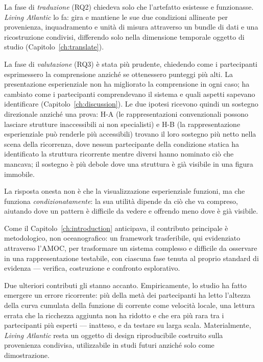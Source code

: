 La fase di \emph{traduzione} (RQ2) chiedeva solo che l'artefatto esistesse e funzionasse. \emph{Living Atlantic} lo fa: gira e mantiene le sue due condizioni allineate per provenienza, inquadramento e unità di misura attraverso un bundle di dati e una ricostruzione condivisi, differendo solo nella dimensione temporale oggetto di studio (Capitolo~\ref{ch:translate}).

La fase di \emph{valutazione} (RQ3) è stata più prudente, chiedendo come i partecipanti esprimessero la comprensione anziché se ottenessero punteggi più alti. La presentazione esperienziale non ha migliorato la comprensione in ogni caso; ha cambiato come i partecipanti comprendevano il sistema e quali aspetti sapevano identificare (Capitolo~\ref{ch:discussion}). Le due ipotesi ricevono quindi un sostegno direzionale anziché una prova: H-A (le rappresentazioni convenzionali possono lasciare strutture inaccessibili ai non specialisti) e H-B (la rappresentazione esperienziale può renderle più accessibili) trovano il loro sostegno più netto nella scena della ricorrenza, dove nessun partecipante della condizione statica ha identificato la struttura ricorrente mentre diversi hanno nominato ciò che mancava; il sostegno è più debole dove una struttura è già visibile in una figura immobile.

La risposta onesta non è che la visualizzazione esperienziale funzioni, ma che funziona \emph{condizionatamente}: la sua utilità dipende da ciò che va compreso, aiutando dove un pattern è difficile da vedere e offrendo meno dove è già visibile.

Come il Capitolo~\ref{ch:introduction} anticipava, il contributo principale è metodologico, non oceanografico: un framework trasferibile, qui evidenziato attraverso l'AMOC, per trasformare un sistema complesso e difficile da osservare in una rappresentazione testabile, con ciascuna fase tenuta al proprio standard di evidenza --- verifica, costruzione e confronto esplorativo.

Due ulteriori contributi gli stanno accanto. Empiricamente, lo studio ha fatto emergere un errore ricorrente: più della metà dei partecipanti ha letto l'altezza della curva cumulata della funzione di corrente come velocità locale, una lettura errata che la ricchezza aggiunta non ha ridotto e che era più rara tra i partecipanti più esperti --- inatteso, e da testare su larga scala. Materialmente, \emph{Living Atlantic} resta un oggetto di design riproducibile costruito sulla provenienza condivisa, utilizzabile in studi futuri anziché solo come dimostrazione.

